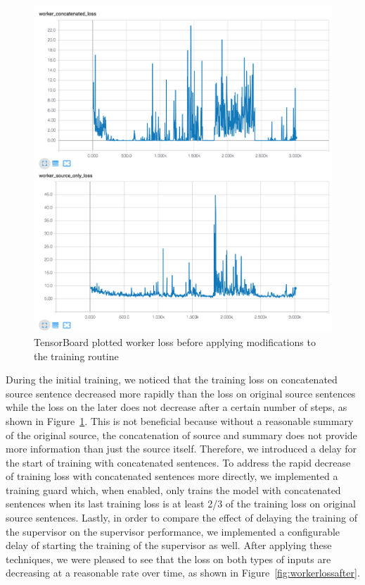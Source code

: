 \documentclass[letterpaper]{article} %
\begin{document}
\begin{figure}[h]
	\includegraphics[scale=0.3]{worker_loss_before}
	\centering
	\caption{TensorBoard \cite{tensorflow2015-whitepaper} plotted worker loss before applying modifications to the training routine}
	\label{fig:workerlossbefore}
\end{figure}

During the initial training, we noticed that the training loss on concatenated source sentence decreased more rapidly than the loss on original source sentences while the loss on the later does not decrease after a certain number of steps, as shown in Figure~\ref{fig:workerlossbefore}. This is not beneficial because without a reasonable summary of the original source, the concatenation of source and summary does not provide more information than just the source itself. Therefore, we introduced a delay for the start of training with concatenated sentences. To address the rapid decrease of training loss with concatenated sentences more directly, we implemented a training guard which, when enabled, only trains the model with concatenated sentences when its last training loss is at least 2/3 of the training loss on original source sentences. Lastly, in order to compare the effect of delaying the training of the supervisor on the supervisor performance, we implemented a configurable delay of starting the training of the supervisor as well. After applying these techniques, we were pleased to see that the loss on both types of inputs are decreasing at a reasonable rate over time, as shown in Figure~\ref{fig:workerlossafter}.
\end{document}
